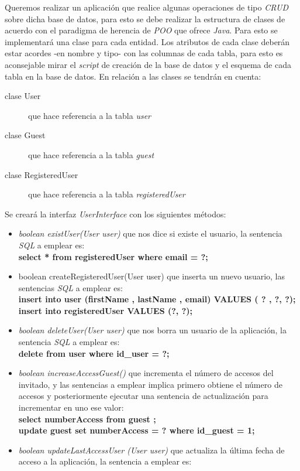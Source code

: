\documentclass[addpoints,12pt]{exam}
\begin{document}
\begin{questions}
\question Queremos realizar un aplicación que realice algunas operaciones de tipo \emph{CRUD} sobre dicha base de datos, para esto se debe realizar la estructura de clases de acuerdo con el paradigma de herencia de \emph{POO} que ofrece \emph{Java}. Para esto se implementará una clase para cada entidad. Los atributos de cada clase deberán estar acordes -en nombre y tipo- con las columnas de cada tabla, para esto es aconsejable mirar el \emph{script} de creación de la base de datos y el esquema de cada tabla en la base de datos. En relación a las clases se tendrán en cuenta:
\begin{description}
\item[clase User] que hace referencia a la tabla \emph{user}
\item[clase Guest] que hace referencia a la tabla \emph{guest}
\item[clase RegisteredUser] que hace referencia a la tabla \emph{registeredUser}
\end{description}
Se creará la interfaz \emph{UserInterface} con los siguientes métodos:
\begin{itemize}
\item  \emph{boolean existUser(User user)} que nos dice si existe el usuario, la sentencia \emph{SQL} a emplear es:\\
\textbf{select * from registeredUser where email = ?;}
\item boolean createRegisteredUser(User user) que inserta un nuevo usuario, las sentencias \emph{SQL} a emplear es:\\
\textbf{insert into user (firstName , lastName , email) VALUES ( ? , ?, ?);\\
insert into registeredUser VALUES (?, ?);}
\item \emph{boolean deleteUser(User user)} que nos borra un usuario de la aplicación, la sentencia \emph{SQL} a emplear es:\\
\textbf{delete from user where id\_user = ?;}
\item \emph{boolean increaseAccessGuest()} que incrementa el número de accesos del invitado, y las sentencias a emplear implica primero obtiene el número de accesos y posteriormente ejecutar una sentencia de actualización para incrementar en uno ese valor:\\
\textbf{select numberAccess from guest ;\\
update guest set numberAccess = ? where id\_guest = 1;}
\item \emph{boolean updateLastAccessUser (User user)}  que actualiza la última fecha de acceso a la aplicación, la sentencia a emplear es:\\

\end{itemize}
\end{questions}
\end{document}
